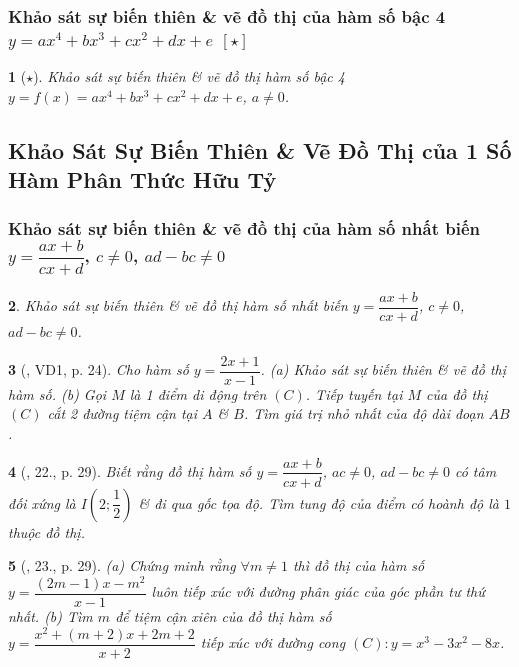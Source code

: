 \documentclass{article}
\newtheorem{baitoan}{}
\begin{document}
\subsubsection{Khảo sát sự biến thiên \& vẽ đồ thị của hàm số bậc 4 $y = ax^4 + bx^3 + cx^2 + dx + e$ $[\star]$}

\begin{baitoan}[$\star$]
	Khảo sát sự biến thiên \& vẽ đồ thị hàm số bậc 4 $y = f(x) = ax^4 + bx^3 + cx^2 + dx + e$, $a\ne 0$.
\end{baitoan}


\subsection{Khảo Sát Sự Biến Thiên \& Vẽ Đồ Thị của 1 Số Hàm Phân Thức Hữu Tỷ}

\subsubsection{Khảo sát sự biến thiên \& vẽ đồ thị của hàm số nhất biến $y = \dfrac{ax + b}{cx + d}$, $c\ne 0$, $ad - bc\ne 0$}

\begin{baitoan}
	Khảo sát sự biến thiên \& vẽ đồ thị hàm số nhất biến $y = \dfrac{ax + b}{cx + d}$, $c\ne 0$, $ad - bc\ne 0$.
\end{baitoan}

\begin{baitoan}[\cite{TLCT_giai_tich_12}, VD1, p. 24]
	Cho hàm số $y = \dfrac{2x + 1}{x - 1}$. (a) Khảo sát sự biến thiên \& vẽ đồ thị hàm số. (b) Gọi $M$ là 1 điểm di động trên $(C)$. Tiếp tuyến tại $M$ của đồ thị $(C)$ cắt 2 đường tiệm cận tại $A$ \& $B$. Tìm giá trị nhỏ nhất của độ dài đoạn $AB$.
\end{baitoan}

\begin{baitoan}[\cite{TLCT_giai_tich_12}, 22., p. 29]
	Biết rằng đồ thị hàm số $y = \dfrac{ax + b}{cx + d}$, $ac\ne 0$, $ad - bc\ne 0$ có tâm đối xứng là $I\left(2;\dfrac{1}{2}\right)$ \& đi qua gốc tọa độ. Tìm tung độ của điểm có hoành độ là $1$ thuộc đồ thị.
\end{baitoan}

\begin{baitoan}[\cite{TLCT_giai_tich_12}, 23., p. 29]
	(a) Chứng minh rằng $\forall m\ne 1$ thì đồ thị của hàm số $y = \dfrac{(2m - 1)x - m^2}{x - 1}$ luôn tiếp xúc với đường phân giác của góc phần tư thứ nhất. (b) Tìm $m$ để tiệm cận xiên của đồ thị hàm số $y = \dfrac{x^2 + (m + 2)x + 2m + 2}{x + 2}$ tiếp xúc với đường cong $(C):y = x^3 - 3x^2 - 8x$.	
\end{baitoan}
\end{document}
